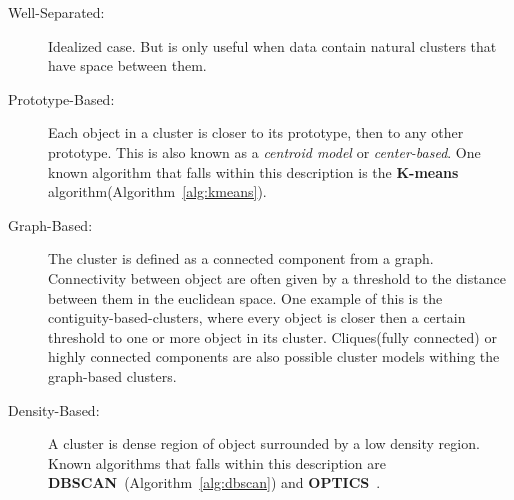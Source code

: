 \begin{description}
	\item[Well-Separated:] Idealized case. But is only useful when data contain natural clusters that have space between them.
	\item[Prototype-Based:] Each object in a cluster is closer to its prototype, then to any other prototype. This is also known as a \textit{centroid model} or \textit{center-based}. One known algorithm that falls within this description is the \textbf{K-means} algorithm(Algorithm~\ref{alg:kmeans}).
	\item[Graph-Based:] The cluster is defined as a connected component from a graph. Connectivity between object are often given by a threshold to the distance between them in the euclidean space. One example of this is the contiguity-based-clusters, where every object is closer then a certain threshold to one or more object in its cluster. Cliques(fully connected) or highly connected components are also possible cluster models withing the graph-based clusters. 
	\item[Density-Based:] A cluster is dense region of object surrounded by a low density region. Known algorithms that falls within this description are \textbf{DBSCAN}~\cite{Ester96adensity-based}(Algorithm~\ref{alg:dbscan}) and \textbf{OPTICS}~\cite{Ankerst99optics:ordering}.
\end{description}

